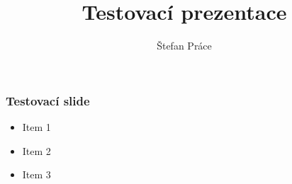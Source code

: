 \documentclass{tulpresentation}
\title{Testovací prezentace}
\author{Štefan Práce}
\begin{document}
	
	\TULtitleframe
	
	\begin{frame}
		\frametitle{Testovací slide}
    \begin{itemize}
      \item Item 1
      \item Item 2
      \item Item 3
    \end{itemize}
	\end{frame}
  
  \TULendframe
\end{document}

